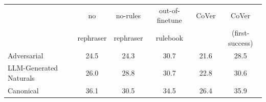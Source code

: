 \begin{tabular}{@{}lccccc@{}}
\toprule
 & no & no-rules & out-of-finetune & CoVer & CoVer \\
 & rephraser & rephraser & rulebook & & (first-success) \\
\midrule
Adversarial & 24.5 & 24.3 & 30.7 & 21.6 & 28.5 \\
LLM-Generated Naturals & 26.0 & 28.8 & 30.7 & 22.8 & 30.6 \\
Canonical & 36.1 & 30.5 & 34.5 & 26.4 & 35.9 \\
\bottomrule
\end{tabular}
